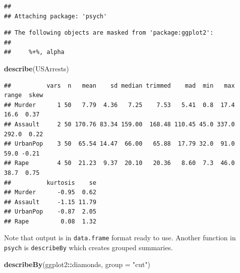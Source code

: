 \documentclass[
]{book}
\newenvironment{Shaded}{\begin{snugshade}}{\end{snugshade}}
\newcommand{\AttributeTok}[1]{\textcolor[rgb]{0.13,0.29,0.53}{#1}}
\newcommand{\FunctionTok}[1]{\textcolor[rgb]{0.13,0.29,0.53}{\textbf{#1}}}
\newcommand{\NormalTok}[1]{#1}
\newcommand{\SpecialCharTok}[1]{\textcolor[rgb]{0.81,0.36,0.00}{\textbf{#1}}}
\newcommand{\StringTok}[1]{\textcolor[rgb]{0.31,0.60,0.02}{#1}}
\begin{document}
\begin{verbatim}
## 
## Attaching package: 'psych'
\end{verbatim}

\begin{verbatim}
## The following objects are masked from 'package:ggplot2':
## 
##     %+%, alpha
\end{verbatim}

\begin{Shaded}
\begin{Highlighting}[]
\FunctionTok{describe}\NormalTok{(USArrests)}
\end{Highlighting}
\end{Shaded}

\begin{verbatim}
##          vars  n   mean    sd median trimmed    mad  min   max range  skew
## Murder      1 50   7.79  4.36   7.25    7.53   5.41  0.8  17.4  16.6  0.37
## Assault     2 50 170.76 83.34 159.00  168.48 110.45 45.0 337.0 292.0  0.22
## UrbanPop    3 50  65.54 14.47  66.00   65.88  17.79 32.0  91.0  59.0 -0.21
## Rape        4 50  21.23  9.37  20.10   20.36   8.60  7.3  46.0  38.7  0.75
##          kurtosis    se
## Murder      -0.95  0.62
## Assault     -1.15 11.79
## UrbanPop    -0.87  2.05
## Rape         0.08  1.32
\end{verbatim}

Note that output is in \texttt{data.frame} format ready to use. Another function in \texttt{psych} is \texttt{describeBy} which creates grouped summaries.

\begin{Shaded}
\begin{Highlighting}[]
\FunctionTok{describeBy}\NormalTok{(ggplot2}\SpecialCharTok{::}\NormalTok{diamonds, }\AttributeTok{group =} \StringTok{"cut"}\NormalTok{)}
\end{Highlighting}
\end{Shaded}
\end{document}
